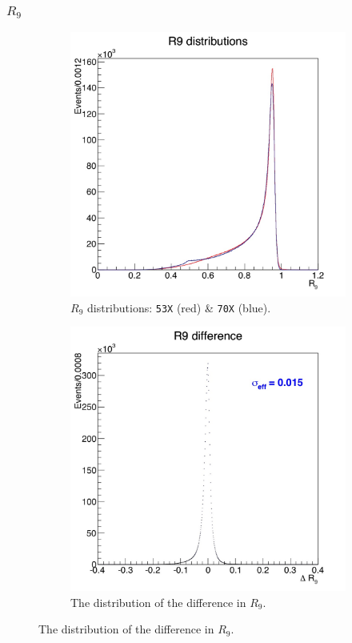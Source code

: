 \documentclass[10pt]{article}
\begin{document}
\subsubsection{$R_9$}
\begin{figure}[h!]
        \centering
        \begin{subfigure}[b]{0.37\textwidth}
                \includegraphics[width=\textwidth]{fullRunPlots/R9_dist}
                \caption{$R_9$ distributions: \texttt{53X} (red) \& \texttt{70X} (blue).}
                \label{r9Dist}
        \end{subfigure}%
        \quad\quad\quad
        \begin{subfigure}[b]{0.37\textwidth}
                \includegraphics[width=\textwidth]{fullRunPlots/R9}
                \caption{The distribution of the difference in $R_9$.}
                \label{r9Diff}
        \end{subfigure}
       

\end{figure}
\end{document}
